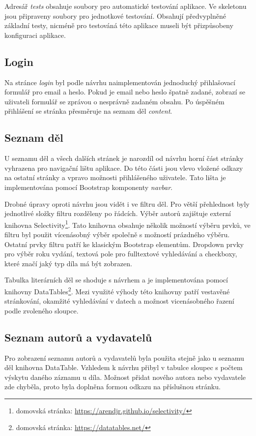              Adresář \textit{tests} obsahuje soubory pro automatické testování aplikace. Ve skeletonu jsou připraveny soubory pro jednotkové testování. Obsahují předvyplněné základní testy, nicméně pro testováná této aplikace museli být přizpůsobeny konfiguraci aplikace.
             
        \subsection{Login}
            Na stránce \textit{login} byl podle návrhu naimplementován jednoduchý přihlašovací formulář pro email a heslo. Pokud je email nebo heslo špatně zadané, zobrazí se uživateli formulář se zprávou o nesprávně zadaném obsahu. Po úspěšném přihlášení se stránka přesměruje na seznam děl \textit{content}.
            
        \subsection{Seznam děl}
            U seznamu děl a všech dalších stránek je narozdíl od návrhu horní část stránky vyhrazena pro navigační lištu aplikace. Do této části jsou vlevo vložené odkazy na ostatní stránky a vpravo možnosti přihlášeného uživatele. Tato lišta je implementována pomocí Bootstrap komponenty \textit{navbar}. 
            
            Drobné úpravy oproti návrhu jsou vidět i ve filtru děl. Pro větší přehlednost byly jednotlivé složky filtru rozděleny po řádcích. Výběr autorů zajištuje externí knihovna Selectivity\footnote{domovská stránka: \url{https://arendjr.github.io/selectivity/}}. Tato knihovna obsahuje několik možností výběru prvků, ve filtru byl použit vícenásobný výběr společně s možností prázdného výběru. Ostatní prvky filtru patří ke klasickým Bootstrap elementům. Dropdown prvky pro výběr roku vydání, textová pole pro fulltextové vyhledávání a checkboxy, které značí jaký typ díla má být zobrazen.
            
            Tabulka literárních děl se shoduje s návrhem a je implementována pomocí knihovny DataTables\footnote{domovská stránka: \url{https://datatables.net/}}. Mezi využité  výhody této knihovny patří vestavěné stránkování, okamžité vyhledávání v datech a možnost vicenásobného řazení podle zvoleného sloupce.
            
        \subsection{Seznam autorů a vydavatelů}
            Pro zobrazení seznamu autorů a vydavatelů byla použita stejně jako u seznamu děl knihovna DataTable. Vzhledem k návrhu přibyl v tabulce sloupec s počtem výskytu daného záznamu u díla. Možnost přidat nového autora nebo vydavatele zde chyběla, proto byla doplněna formou odkazu na příslušnou stránku.
        
